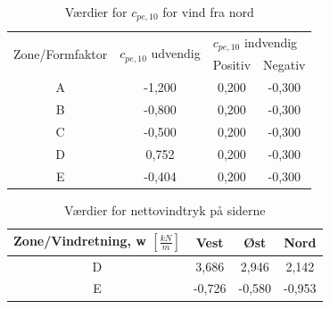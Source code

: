 \begin{table}[htb]
	\begin{center}
		\begin{tabular}{ |c|c|c|c| } 
			\hline
			\multirow{2}{*}{Zone/Formfaktor} & \multirow{2}{*}{$c_{pe,10}$ udvendig} & \multicolumn{2}{l|}{$c_{pe,10}$ indvendig} \\ \cline{3-4} 
			& & Positiv & Negativ   		\\ \hline
			A & -1,200 & 0,200 & -0,300 \\	\hline
			B & -0,800 & 0,200 & -0,300 \\	\hline
			C & -0,500 & 0,200 & -0,300 \\	\hline 
			D & 0,752 & 0,200 & -0,300 \\	\hline
			E & -0,404 & 0,200 & -0,300 \\	\hline
		\end{tabular}
		\caption{Værdier for $c_{pe,10}$ for vind fra nord}
		\label{tab:gg}
	\end{center}
\end{table}

\begin{table}[htb]
	\begin{center}
		\begin{tabular}{|c|c|c|c|}
			\hline
			Zone/Vindretning, w $[\frac{kN}{m}]$ & Vest & Øst & Nord \\ \hline
			D & 3,686 & 2,946 & 2,142 \\ \hline
			E & -0,726 & -0,580 & -0,953 \\ \hline
		\end{tabular}
		\caption{Værdier for nettovindtryk på siderne}
		\label{tab:hh}
	\end{center}
\end{table}

